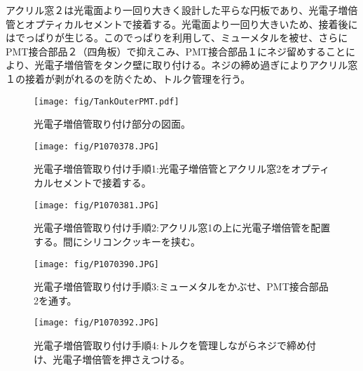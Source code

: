 アクリル窓２は光電面より一回り大きく設計した平らな円板であり、光電子増倍管とオプティカルセメントで接着する。光電面より一回り大きいため、接着後にはでっぱりが生じる。このでっぱりを利用して、ミューメタルを被せ、さらにPMT接合部品２（四角板）で抑えこみ、PMT接合部品１にネジ留めすることにより、光電子増倍管をタンク壁に取り付ける。ネジの締め過ぎによりアクリル窓１の接着が剥がれるのを防ぐため、トルク管理を行う。



\begin{figure}[!h]
\centering
\texttt{[image: fig/TankOuterPMT.pdf]}
\caption[光電子増倍管取り付け部分の図面]{光電子増倍管取り付け部分の図面。}
\label{SetPMT}
\end{figure}

\begin{figure}[htbp]
\begin{minipage}{0.47\textwidth}
\centering
\texttt{[image: fig/P1070378.JPG]}
\caption[光電子増倍管取り付け手順1]{光電子増倍管取り付け手順1:光電子増倍管とアクリル窓2をオプティカルセメントで接着する。}
\label{SetPMTTest}
\end{minipage}
\hfil%
\begin{minipage}{0.47\textwidth}
\centering
\texttt{[image: fig/P1070381.JPG]}
\caption[光電子増倍管取り付け手順2]{光電子増倍管取り付け手順2:アクリル窓1の上に光電子増倍管を配置する。間にシリコンクッキーを挟む。}
\label{SetPMTTest}
\end{minipage}
\end{figure}
%
\begin{figure}[htbp]
\begin{minipage}{0.47\textwidth}
\centering
\texttt{[image: fig/P1070390.JPG]}
\caption[光電子増倍管取り付け手順3]{光電子増倍管取り付け手順3:ミューメタルをかぶせ、PMT接合部品2を通す。}
\label{SetPMTTest}
\end{minipage}
\hfil%
\begin{minipage}{0.47\textwidth}
\centering
\texttt{[image: fig/P1070392.JPG]}
\caption[光電子増倍管取り付け手順4]{光電子増倍管取り付け手順4:トルクを管理しながらネジで締め付け、光電子増倍管を押さえつける。}
\label{SetPMTTest}
\end{minipage}
\end{figure}
\fi

